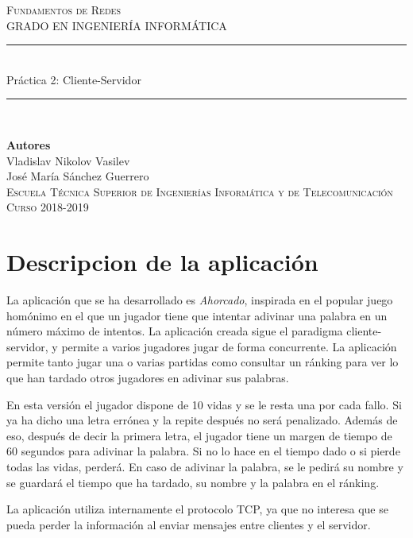 \documentclass[11pt,a4paper]{article}
\begin{document}

	\begin{titlepage}

		\begin{minipage}{\textwidth}

			\centering
			\textsc{\Large Fundamentos de Redes\\[0.2cm]}
			\textsc{GRADO EN INGENIERÍA INFORMÁTICA}\\[1cm]

			\noindent\rule[-1ex]{\textwidth}{1pt}\\[3.5ex]
			{\Huge Práctica 2: Cliente-Servidor\\}
			\noindent\rule[-1ex]{\textwidth}{2pt}\\[3.5ex]
		\end{minipage}

		\vspace{1.5cm}
		
		\begin{minipage}{\textwidth}
			\centering

			\textbf{Autores}\\ {Vladislav Nikolov Vasilev\\José María Sánchez Guerrero}\\[2.5ex]

			\vspace{1cm}
			\textsc{Escuela Técnica Superior de Ingenierías Informática y de Telecomunicación}\\
			\vspace{1cm}
			\textsc{Curso 2018-2019}
		\end{minipage}
	\end{titlepage}
	
	\tableofcontents
	\newpage
	
	\section{Descripcion de la aplicación}
	La aplicación que se ha desarrollado es \textit{Ahorcado}, inspirada en el popular juego homónimo en el que un jugador tiene que intentar adivinar una palabra en un número máximo de intentos. La aplicación creada sigue el paradigma cliente-servidor, y permite a varios jugadores jugar de forma concurrente. La aplicación permite tanto jugar una o varias partidas como consultar un ránking para ver lo que han tardado otros jugadores en adivinar sus palabras.\par
	En esta versión el jugador dispone de 10 vidas y se le resta una por cada fallo. Si ya ha dicho una letra errónea y la repite después no será penalizado. Además de eso, después de decir la primera letra, el jugador tiene un margen de tiempo de 60 segundos para adivinar la palabra. Si no lo hace en el tiempo dado o si pierde todas las vidas, perderá. En caso de adivinar la palabra, se le pedirá su nombre y se guardará el tiempo que ha tardado, su nombre y la palabra en el ránking.\par
	La aplicación utiliza internamente el protocolo TCP, ya que no interesa que se pueda perder la información al enviar mensajes entre clientes y el servidor.
	
\end{document}
